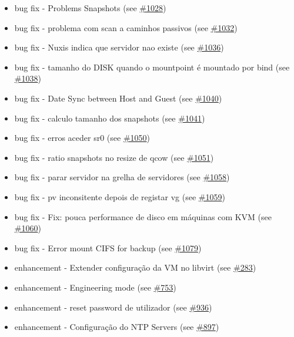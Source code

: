\begin{itemize}
    \item bug fix - Problems Snapshots (see \href{https://srcmaster.eurotux.com/pm/p/etva/ticket/1028}{\#1028})
    \item bug fix - problema com scan a caminhos passivos (see \href{https://srcmaster.eurotux.com/pm/p/etva/ticket/1032}{\#1032})
    \item bug fix - Nuxis indica que servidor nao existe (see \href{https://srcmaster.eurotux.com/pm/p/etva/ticket/1036}{\#1036})
    \item bug fix - tamanho do DISK quando o mountpoint é mountado por bind (see \href{https://srcmaster.eurotux.com/pm/p/etva/ticket/1038}{\#1038})
    \item bug fix - Date Sync between Host and Guest (see \href{https://srcmaster.eurotux.com/pm/p/etva/ticket/1040}{\#1040})
    \item bug fix - calculo tamanho dos snapshots (see \href{https://srcmaster.eurotux.com/pm/p/etva/ticket/1041}{\#1041})
    \item bug fix - erros aceder sr0 (see \href{https://srcmaster.eurotux.com/pm/p/etva/ticket/1050}{\#1050})
    \item bug fix - ratio snapshots no resize de qcow (see \href{https://srcmaster.eurotux.com/pm/p/etva/ticket/1051}{\#1051})
    \item bug fix - parar servidor na grelha de servidores (see \href{https://srcmaster.eurotux.com/pm/p/etva/ticket/1058}{\#1058})
    \item bug fix - pv inconsitente depois de registar vg (see \href{https://srcmaster.eurotux.com/pm/p/etva/ticket/1059}{\#1059})
    \item bug fix - Fix: pouca performance de disco em máquinas com KVM (see \href{https://srcmaster.eurotux.com/pm/p/etva/ticket/1060}{\#1060})
    \item bug fix - Error mount CIFS for backup (see \href{https://srcmaster.eurotux.com/pm/p/etva/ticket/1079}{\#1079})
    \item enhancement - Extender configuração da VM no libvirt (see \href{https://srcmaster.eurotux.com/pm/p/etva/ticket/283}{\#283})
    \item enhancement - Engineering mode (see \href{https://srcmaster.eurotux.com/pm/p/etva/ticket/753}{\#753})
    \item enhancement - reset password de utilizador (see \href{https://srcmaster.eurotux.com/pm/p/etva/ticket/936}{\#936})
    \item enhancement - Configuração do NTP Servers (see \href{https://srcmaster.eurotux.com/pm/p/etva/ticket/897}{\#897})

\end{itemize}
